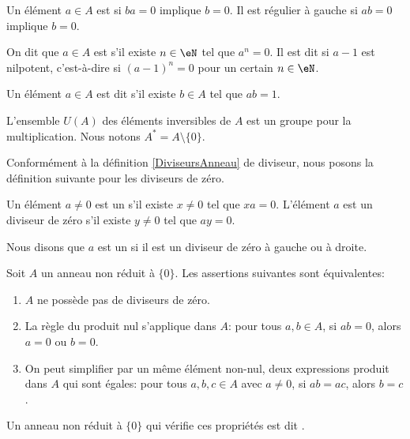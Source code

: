 Un élément \( a\in A\) est  si \( ba=0\) implique \( b=0\). Il est régulier à gauche si \( ab=0\) implique \( b=0\).

\begin{definition}
	On dit que \( a \in A \) est  s'il existe \( n \in \eN \) tel que \( a^n = 0 \). Il est dit  si \( a-1\) est nilpotent, c'est-à-dire si \( (a-1)^n =0\) pour un certain \( n \in \eN \).

	Un élément \( a \in A \) est dit  s'il existe \( b \in A \) tel que \( ab = 1 \).
\end{definition}

L'ensemble \( U(A)\) des éléments inversibles de \( A\) est un groupe pour la multiplication. Nous notons \( A^*=A\setminus\{ 0 \}\).

Conformément à la définition \ref{DiviseursAnneau} de diviseur, nous posons la définition suivante pour les diviseurs de zéro.
\begin{definition}
    Un élément \( a\neq 0\) est un  s'il existe \( x\neq 0\) tel que $xa=0$. L'élément \( a\) est un diviseur de zéro  s'il existe \( y\neq 0\) tel que \( ay=0\).

    Nous disons que \( a\) est un  si il est un diviseur de zéro à gauche ou à droite.
\end{definition}

\begin{propositionDef}           \label{DEFooTAOPooWDPYmd}
    Soit $A$ un anneau non réduit à \( \{ 0 \}\). Les assertions suivantes sont équivalentes:
    \begin{enumerate}
        \item       \label{ITEMooMXMKooXMYpkN}
            \( A\) ne possède pas de diviseurs de zéro.
        \item       \label{ITEMooLAJCooFwxXrV}
            La règle du produit nul s'applique dans $A$: pour tous \( a, b \in A \), si \( ab=0\), alors \( a = 0\) ou \( b = 0\).
        \item       \label{ITEMooQNTFooSRrVPK}
            On peut simplifier par un même élément non-nul, deux expressions produit dans $A$ qui sont égales: pour tous \( a, b, c \in A \) avec \( a \neq 0 \), si \( ab = ac \), alors \( b = c \).
    \end{enumerate}
    Un anneau non réduit à \( \{ 0 \}\) qui vérifie ces propriétés est dit .
\end{propositionDef}

